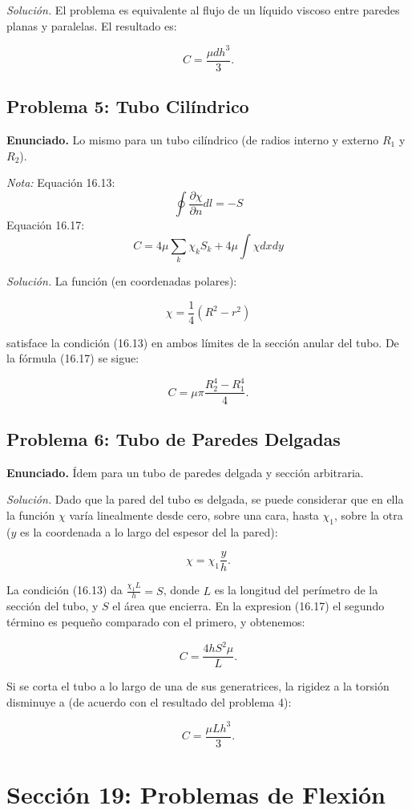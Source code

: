 \documentclass{article}
\begin{document}
\textit{Solución.} El problema es equivalente al flujo de un líquido viscoso entre paredes planas y paralelas. El resultado es:

$$
C = \frac{\mu dh^3}{3}.
$$

\subsection*{Problema 5: Tubo Cilíndrico}
\textbf{Enunciado.} Lo mismo para un tubo cilíndrico (de radios interno y externo $R_1$ y $R_2$).

\textit{Nota:} Equación 16.13: $$ \oint \frac{\partial \chi}{\partial n}dl=-S $$
Equación 16.17: $$ C=4\mu \sum_{k}\chi_k S_k +4\mu \int \chi dx dy $$

\textit{Solución.} La función (en coordenadas polares):

$$
\chi = \frac{1}{4}(R^2 - r^2)
$$

satisface la condición (16.13) en ambos límites de la sección anular del tubo. De la fórmula (16.17) se sigue:

$$
C = \mu \pi \frac{R_2^4 - R_1^4}{4}.
$$

\subsection*{Problema 6: Tubo de Paredes Delgadas}
\textbf{Enunciado.} Ídem para un tubo de paredes delgada y sección arbitraria.

\textit{Solución.} Dado que la pared del tubo es delgada, se puede considerar que en ella la función $\chi$ varía linealmente desde cero, sobre una cara, hasta $\chi_1$, sobre la otra ($y$ es la coordenada a lo largo del espesor del la pared):

$$
\chi = \chi_1 \frac{y}{h}.
$$

La condición (16.13) da $\frac{\chi_1 L}{h} = S$, donde $L$ es la longitud del perímetro de la sección del tubo, y $S$ el área que encierra. En la expresion (16.17) el segundo término es pequeño comparado con el primero, y obtenemos:

$$
C = \frac{4hS^2 \mu}{L}.
$$

Si se corta el tubo a lo largo de una de sus generatrices, la rigidez a la torsión disminuye a (de acuerdo con el resultado del problema 4):

$$
C = \frac{\mu Lh^3}{3}.
$$

\section*{Sección 19: Problemas de Flexión}
\end{document}
